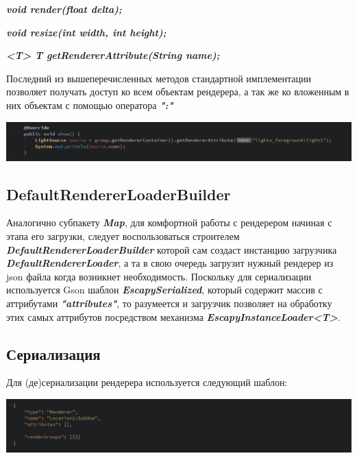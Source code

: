 \documentclass[11pt]{report}
\newenvironment{itemize*}%
  {\begin{itemize}%
    \setlength{\itemsep}{2pt}%
    \setlength{\parskip}{0.75pt}}%
  {\end{itemize}}
\begin{document}
\begin{itemize*}
	\item \textit{\textbf{void render(float delta);}}
	\item \textit{\textbf{void resize(int width, int height);}}
	\item \textit{\textbf{<T> T getRendererAttribute(String name);}}
\end{itemize*}
Последний из вышеперечисленных методов стандартной имплементации позволяет получать доступ ко всем объектам рендерера, а так же ко вложенным в них объектам с помощью оператора \textit{\textbf{":"}}
\begin{center}
	\includegraphics[width=1.2\linewidth]{img/22.png} 
  	\label{img:220} 
\end{center} 

\subsection{DefaultRendererLoaderBuilder}
Аналогично субпакету \textit{\textbf{Map}}, для комфортной работы с рендерером начиная с этапа его загрузки, следует воспользоваться строителем \textit{\textbf{DefaultRendererLoaderBuilder}} которой сам создаст инстанцию загрузчика \textit{\textbf{DefaultRendererLoader}}, а та в свою очередь загрузит нужный рендерер из json файла когда возникнет необходимость. Поскольку для сериализации используется Gson шаблон \textit{\textbf{EscapySerialized}}, который содержит массив с аттрибутами \textit{\textbf{"attributes"}}, то разумеется и загрузчик позволяет на обработку этих самых аттрибутов посредством механизма \textit{\textbf{EscapyInstanceLoader<T>}}.

\subsection{Сериализация}
Для (де)сериализации рендерера используется следующий шаблон:
\begin{center}
	\includegraphics[width=1.2\linewidth]{img/23.png} 
  	\label{img:230} 
\end{center} 
\end{document}
